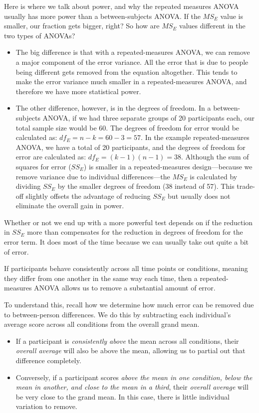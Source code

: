 \documentclass[
  letterpaper,
  DIV=11,
  numbers=noendperiod]{scrreprt}
\begin{document}
Here is where we talk about power, and why the repeated measures ANOVA
usually has more power than a between-subjects ANOVA. If the \(MS_E\)
value is smaller, our fraction gets bigger, right? So how are \(MS_E\)
values different in the two types of ANOVAs?

\begin{itemize}
\item
  The big difference is that with a repeated-measures ANOVA, we can
  remove a major component of the error variance. All the error that is
  due to people being different gets removed from the equation
  altogether. This tends to make the error variance much smaller in a
  repeated-measures ANOVA, and therefore we have more statistical power.
\item
  The other difference, however, is in the degrees of freedom. In a
  between-subjects ANOVA, if we had three separate groups of 20
  participants each, our total sample size would be 60. The degrees of
  freedom for error would be calculated as: \(df_E=n−k=60−3=57\). In the
  example repeated-measures ANOVA, we have a total of 20 participants,
  and the degrees of freedom for error are calculated as:
  \(df_E=(k−1)(n−1)=38\). Although the sum of squares for error
  (\(SS_E\)) is smaller in a repeated-measures design---because we
  remove variance due to individual differences---the \(MS_E\) is
  calculated by dividing \(SS_E\) by the smaller degrees of freedom (38
  instead of 57). This trade-off slightly offsets the advantage of
  reducing \(SS_E\) but usually does not eliminate the overall gain in
  power.
\end{itemize}

Whether or not we end up with a more powerful test depends on if the
reduction in \(SS_E\) more than compensates for the reduction in degrees
of freedom for the error term. It does most of the time because we can
usually take out quite a bit of error.

If participants behave consistently across all time points or
conditions, meaning they differ from one another in the same way each
time, then a repeated-measures ANOVA allows us to remove a substantial
amount of error.

To understand this, recall how we determine how much error can be
removed due to between-person differences. We do this by subtracting
each individual's average score across all conditions from the overall
grand mean.

\begin{itemize}
\item
  If a participant is \emph{consistently above} the mean across all
  conditions, their \emph{overall average} will also be above the mean,
  allowing us to partial out that difference completely.
\item
  Conversely, if a participant scores \emph{above the mean in one
  condition, below the mean in another, and close to the mean in a
  third}, their \emph{overall average} will be very close to the grand
  mean. In this case, there is little individual variation to remove.
\end{itemize}
\end{document}

